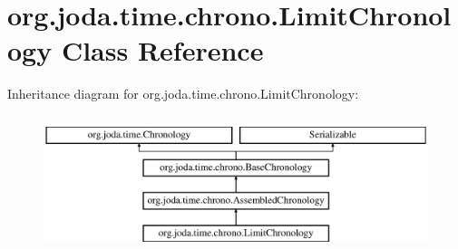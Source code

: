 \hypertarget{classorg_1_1joda_1_1time_1_1chrono_1_1_limit_chronology}{\section{org.\-joda.\-time.\-chrono.\-Limit\-Chronology Class Reference}
\label{classorg_1_1joda_1_1time_1_1chrono_1_1_limit_chronology}
}
Inheritance diagram for org.\-joda.\-time.\-chrono.\-Limit\-Chronology\-:\begin{figure}[H]
\begin{center}
\leavevmode
\includegraphics[height=4.000000cm]{classorg_1_1joda_1_1time_1_1chrono_1_1_limit_chronology}
\end{center}
\end{figure}
